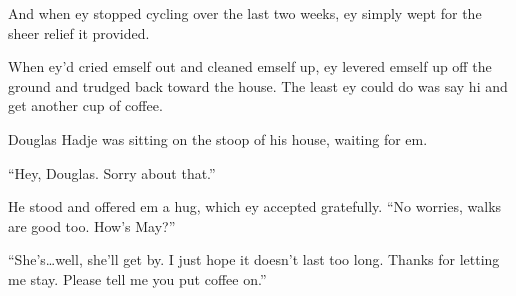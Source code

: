 And when ey stopped cycling over the last two weeks, ey simply wept for the sheer relief it provided.

When ey'd cried emself out and cleaned emself up, ey levered emself up off the ground and trudged back toward the house. The least ey could do was say hi and get another cup of coffee.

Douglas Hadje was sitting on the stoop of his house, waiting for em.

``Hey, Douglas. Sorry about that.''

He stood and offered em a hug, which ey accepted gratefully. ``No worries, walks are good too. How's May?''

``She's\ldots well, she'll get by. I just hope it doesn't last too long. Thanks for letting me stay. Please tell me you put coffee on.''

